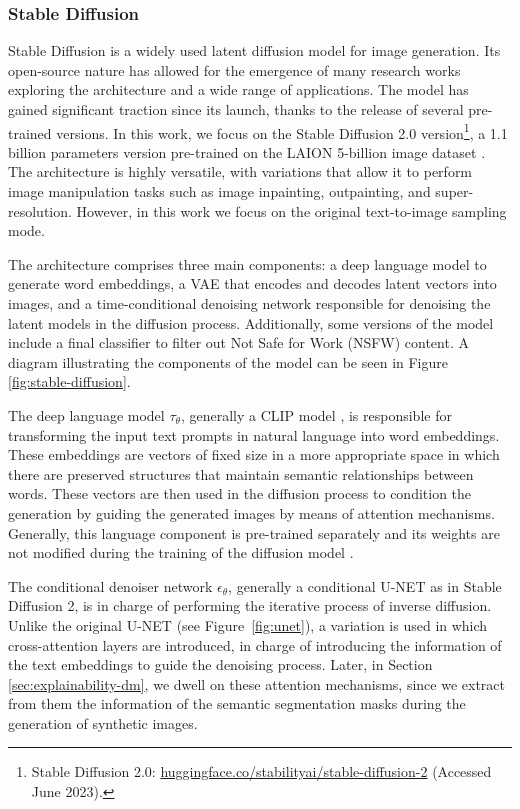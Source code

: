 \subsubsection{Stable Diffusion}


Stable Diffusion \cite{rombach2022high} is a widely used latent diffusion model for image generation. Its open-source nature has allowed for the emergence of many research works exploring the architecture and a wide range of applications. The model has gained significant traction since its launch, thanks to the release of several pre-trained versions. In this work, we focus on the Stable Diffusion 2.0 version\footnote{Stable Diffusion 2.0: \href{https://huggingface.co/stabilityai/stable-diffusion-2}{huggingface.co/stabilityai/stable-diffusion-2} (Accessed June 2023).}, a 1.1 billion parameters version pre-trained on the LAION 5-billion image dataset \cite{schuhmann2022laionb}. The architecture is highly versatile, with variations that allow it to perform image manipulation tasks such as image inpainting, outpainting, and super-resolution. However, in this work we focus on the original text-to-image sampling mode.

The architecture comprises three main components: a deep language model to generate word embeddings, a VAE that encodes and decodes latent vectors into images, and a time-conditional denoising network responsible for denoising the latent models in the diffusion process. Additionally, some versions of the model include a final classifier to filter out Not Safe for Work (NSFW) content. A diagram illustrating the components of the model can be seen in Figure \ref{fig:stable-diffusion}.

The deep language model $\tau_{\theta}$, generally a CLIP model \cite{Radford2021LearningTV}, is responsible for transforming the input text prompts in natural language into word embeddings. These embeddings are vectors of fixed size in a more appropriate space in which there are preserved structures that maintain semantic relationships between words. These vectors are then used in the diffusion process to condition the generation by guiding the generated images by means of attention mechanisms. Generally, this language component is pre-trained separately and its weights are not modified during the training of the diffusion model \cite{dosovitskiy2020vit}.

The conditional denoiser network $\epsilon_{\theta}$, generally a conditional U-NET as in Stable Diffusion 2, is in charge of performing the iterative process of inverse diffusion. Unlike the original U-NET \cite{UNET} (see Figure~\ref{fig:unet}), a variation is used in which cross-attention layers are introduced, in charge of introducing the information of the text embeddings to guide the denoising process. Later, in Section \ref{sec:explainability-dm}, we dwell on these attention mechanisms, since we extract from them the information of the semantic segmentation masks during the generation of synthetic images.

